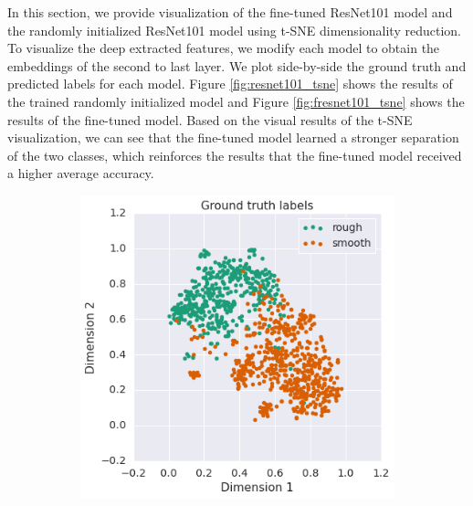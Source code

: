 \documentclass{aci}
\numberwithin{equation}{section}
\begin{document}
In this section, we provide visualization of the fine-tuned ResNet101 model and
the randomly initialized ResNet101 model using t-SNE dimensionality reduction.
To visualize the deep extracted features, we modify each model to obtain the
embeddings of the second to last layer. We plot side-by-side the ground truth
and predicted labels for each model. Figure \ref{fig:resnet101_tsne} shows the
results of the trained randomly initialized model and Figure
\ref{fig:fresnet101_tsne} shows the results of the fine-tuned model. Based on
the visual results of the t-SNE visualization, we can see that the fine-tuned
model learned a stronger separation of the two classes, which reinforces the
results that the fine-tuned model received a higher average accuracy.

\begin{figure}[h]
    \centering
    \begin{subfigure}{.45\textwidth}
        \includegraphics[width=1\linewidth]{thesis_assets/plots/fresnet101_gt_tsne.png}
    \end{subfigure}
    \begin{subfigure}{.45\textwidth}

\end{subfigure}
\end{figure}
\end{document}
